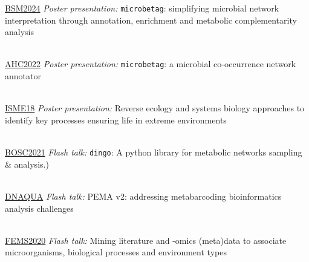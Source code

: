 \documentclass[
    a4paper,
]{fortysecondscv}
\begin{document}
\begin{cvtable}


    {\href{https://belsocmicrobio.be/events/annual-symposium-2024/}{BSM2024}}
    {\textit{Poster presentation:} \texttt{microbetag}: simplifying microbial network interpretation through annotation, enrichment and metabolic complementarity analysis
    }{}

    \\

        {\href{https://appliedhologenomicsconference.eu}{AHC2022}}
        {\textit{Poster presentation:} \texttt{microbetag}: a microbial co-occurrence network annotator}{}

    \\

        {\href{https://isme18.isme-microbes.org}{ISME18}}
        {\textit{Poster presentation:} Reverse ecology and systems biology approaches to identify key processes ensuring life in extreme environments}{}

    \\


        {\href{https://www.open-bio.org/events/bosc-2021/}{BOSC2021}}
        {\textit{Flash talk:} \texttt{dingo}: A python library for metabolic networks sampling \& analysis.)}{}

    \\
    
        {\href{https://symposium.inrae.fr/dnaqua-conference-evian2021/}{DNAQUA}}
        {\textit{Flash talk:} PEMA v2: addressing metabarcoding bioinformatics analysis challenges}{}
        
    \\

        {\href{https://fems2020belgrade.com/}{FEMS2020}}
        {\textit{Flash talk:} Mining literature and -omics (meta)data to associate microorganisms, biological processes and environment types}{}

    \\


\end{cvtable}
\end{document}
